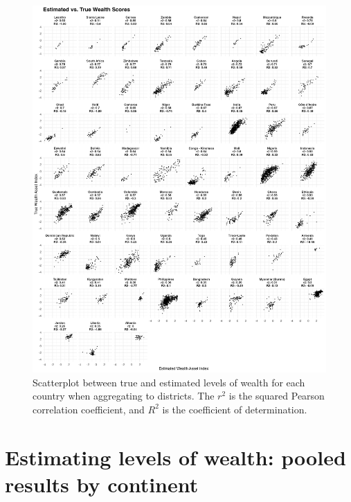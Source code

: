 \documentclass{article}
\begin{document}
\begin{figure}[H]
    \centering
    \includegraphics[width=1\textwidth]{figures/r2_scatter_eachcountry_districtagg.png}
    \caption{Scatterplot between true and estimated levels of wealth for each country when aggregating to districts. The $r^2$ is the squared Pearson correlation coefficient, and $R^2$ is the coefficient of determination.}
     \label{fig:r2_scatter_eachcountry_districtagg}
\end{figure}

\newpage
\section{Estimating levels of wealth: pooled results by continent}
\label{si:r2_scatter_pooled_by_continent}
\end{document}
